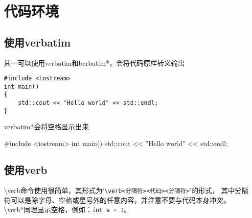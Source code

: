 \section{代码环境}
\subsection{使用verbatim}
其一可以使用verbatim和berbatim*，会将代码原样转义输出
\begin{verbatim}
#include <iostream>
int main()
{
    std::cout << "Hello world" << std::endl;
}
\end{verbatim}
verbatim*会将空格显示出来
\begin{verbatim*}
#include <iostream>
int main()
{
    std::cout << "Hello world" << std::endl;
}
\end{verbatim*}

\subsection{使用verb}
\textbackslash verb命令使用很简单，其形式为`\verb+\verb<分隔符><代码><分隔符>+'的形式，
其中分隔符可以是除字母、空格或星号外的任意内容，并注意不要与代码本身冲突。
\textbackslash verb*同理显示空格，例如：\verb*+int a = 1+。